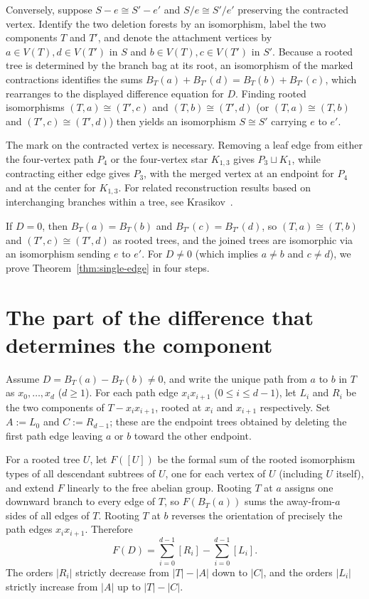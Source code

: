 \documentclass[10pt]{article}
\begin{document}
Conversely, suppose $S-e\cong S'-e'$ and $S/e\cong S'/e'$ preserving the contracted vertex. Identify the two deletion forests by an isomorphism, label the two components $T$ and $T'$, and denote the attachment vertices by $a\in V(T), d\in V(T')$ in $S$ and $b\in V(T), c\in V(T')$ in $S'$. Because a rooted tree is determined by the branch bag at its root, an isomorphism of the marked contractions identifies the sums $B_T(a)+B_{T'}(d) = B_T(b)+B_{T'}(c)$, which rearranges to the displayed difference equation for $D$. Finding rooted isomorphisms $(T,a)\cong (T',c)$ and $(T,b)\cong (T',d)$ (or $(T,a)\cong (T,b)$ and $(T',c)\cong (T',d)$) then yields an isomorphism $S\cong S'$ carrying $e$ to $e'$.

The mark on the contracted vertex is necessary. Removing a leaf edge from either the four-vertex path $P_4$ or the four-vertex star $K_{1,3}$ gives $P_3\sqcup K_1$, while contracting either edge gives $P_3$, with the merged vertex at an endpoint for $P_4$ and at the center for $K_{1,3}$. For related reconstruction results based on interchanging branches within a tree, see Krasikov~\cite{krasikov}.

If $D=0$, then $B_T(a)=B_T(b)$ and $B_{T'}(c)=B_{T'}(d)$, so $(T,a)\cong (T,b)$ and $(T',c)\cong (T',d)$ as rooted trees, and the joined trees are isomorphic via an isomorphism sending $e$ to $e'$. For $D\neq 0$ (which implies $a\neq b$ and $c\neq d$), we prove Theorem~\ref{thm:single-edge} in four steps.

\section{The part of the difference that determines the component}

Assume $D = B_T(a) - B_T(b) \neq 0$, and write the unique path from $a$ to $b$ in $T$ as $x_0,\ldots,x_d$ ($d\ge 1$). For each path edge $x_i x_{i+1}$ ($0\le i\le d-1$), let $L_i$ and $R_i$ be the two components of $T - x_i x_{i+1}$, rooted at $x_i$ and $x_{i+1}$ respectively. Set $A := L_0$ and $C := R_{d-1}$; these are the endpoint trees obtained by deleting the first path edge leaving $a$ or $b$ toward the other endpoint.

For a rooted tree $U$, let $F([U])$ be the formal sum of the rooted isomorphism types of all descendant subtrees of $U$, one for each vertex of $U$ (including $U$ itself), and extend $F$ linearly to the free abelian group. Rooting $T$ at $a$ assigns one downward branch to every edge of $T$, so $F(B_T(a))$ sums the away-from-$a$ sides of all edges of $T$. Rooting $T$ at $b$ reverses the orientation of precisely the path edges $x_i x_{i+1}$. Therefore
\[
F(D) = \sum_{i=0}^{d-1} [R_i] - \sum_{i=0}^{d-1} [L_i].
\]
The orders $|R_i|$ strictly decrease from $|T|-|A|$ down to $|C|$, and the orders $|L_i|$ strictly increase from $|A|$ up to $|T|-|C|$.
\end{document}

